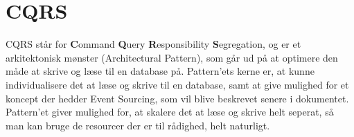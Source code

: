\chapter{CQRS}

CQRS står for \textbf{C}ommand \textbf{Q}uery \textbf{R}esponsibility \textbf{S}egregation, og er et arkitektonisk mønster (Architectural Pattern), som går ud på at optimere den måde at skrive og læse til en database på. Pattern'ets kerne er, at kunne individualisere det at læse og skrive til en database, samt at give mulighed for et koncept der hedder Event Sourcing, som vil blive beskrevet senere i dokumentet. Pattern'et giver mulighed for, at skalere det at læse og skrive helt seperat, så man kan bruge de resourcer der er til rådighed, helt naturligt.
